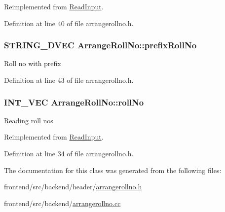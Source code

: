 \-Reimplemented from \hyperlink{classReadInput_a6a96c934f8c9a2a2056dc50505017e52}{\-Read\-Input}.



\-Definition at line 40 of file arrangerollno.\-h.

\hypertarget{classArrangeRollNo_aa0401159b5d59c7afe77980a391a9a0a}{
\subsubsection[{prefix\-Roll\-No}]{\setlength{\rightskip}{0pt plus 5cm}\-S\-T\-R\-I\-N\-G\-\_\-D\-V\-E\-C {\bf \-Arrange\-Roll\-No\-::prefix\-Roll\-No}}}\label{da/de9/classArrangeRollNo_aa0401159b5d59c7afe77980a391a9a0a}
\-Roll no with prefix 

\-Definition at line 43 of file arrangerollno.\-h.

\hypertarget{classArrangeRollNo_ad75d3ee3f709606da5b4871098c3e978}{
\subsubsection[{roll\-No}]{\setlength{\rightskip}{0pt plus 5cm}\-I\-N\-T\-\_\-\-V\-E\-C {\bf \-Arrange\-Roll\-No\-::roll\-No}}}\label{da/de9/classArrangeRollNo_ad75d3ee3f709606da5b4871098c3e978}
\-Reading roll nos 

\-Reimplemented from \hyperlink{classReadInput_a862fbffdffa56fc6d66b1d1f14dae087}{\-Read\-Input}.



\-Definition at line 34 of file arrangerollno.\-h.



\-The documentation for this class was generated from the following files\-:\begin{DoxyCompactItemize}
\item 
frontend/src/backend/header/\hyperlink{arrangerollno_8h}{arrangerollno.\-h}\item 
frontend/src/backend/\hyperlink{arrangerollno_8cc}{arrangerollno.\-cc}\end{DoxyCompactItemize}
